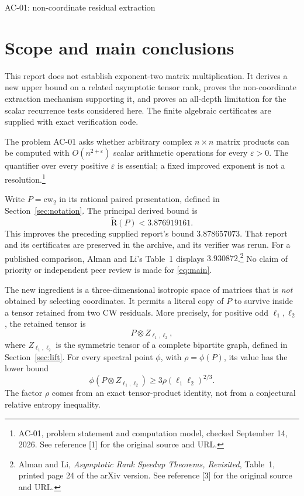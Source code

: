 \documentclass[11pt]{article}
\theoremstyle{definition}\newtheorem{definition}[theorem]{Definition}
\theoremstyle{remark}\newtheorem{remark}[theorem]{Remark}
\newcommand{\AR}{\widetilde{\mathrm R}}
\newcommand{\sref}[2]{\footnote{#1. See reference [#2] for the original source and URL.}}
\begin{document}
{\LARGE AC-01: non-coordinate residual extraction\par}\vspace{0.4em}

\section{Scope and main conclusions}

This report does not establish exponent-two matrix multiplication. It derives a new upper bound on a related asymptotic tensor rank, proves the non-coordinate extraction mechanism supporting it, and proves an all-depth limitation for the scalar recurrence tests considered here. The finite algebraic certificates are supplied with exact verification code.

The problem AC-01 asks whether arbitrary complex $n\times n$ matrix products can be computed with $O(n^{2+\varepsilon})$ scalar arithmetic operations for every $\varepsilon>0$. The quantifier over every positive $\varepsilon$ is essential; a fixed improved exponent is not a resolution.\sref{AC-01, problem statement and computation model, checked September 14, 2026}{1}

Write $P=\mathrm{cw}_2$ in its rational paired presentation, defined in Section~\ref{sec:notation}. The principal derived bound is
\begin{equation}\label{eq:main}
 \boxed{\AR(P)<3.876919161.}
\end{equation}
This improves the preceding supplied report's bound $3.878657073$. That report and its certificates are preserved in the archive, and its verifier was rerun. For a published comparison, Alman and Li's Table~1 displays $3.930872$.\sref{Alman and Li, \emph{Asymptotic Rank Speedup Theorems, Revisited}, Table~1, printed page 24 of the arXiv version}{3} No claim of priority or independent peer review is made for \eqref{eq:main}.

The new ingredient is a three-dimensional isotropic space of matrices that is \emph{not} obtained by selecting coordinates. It permits a literal copy of $P$ to survive inside a tensor retained from two CW residuals. More precisely, for positive odd $\ell_1,\ell_2$, the retained tensor is
\begin{equation}\label{eq:retained-intro}
 P\otimes Z_{\ell_1,\ell_2},
\end{equation}
where $Z_{\ell_1,\ell_2}$ is the symmetric tensor of a complete bipartite graph, defined in Section~\ref{sec:lift}. For every spectral point $\phi$, with $\rho=\phi(P)$, its value has the lower bound
\[
 \phi(P\otimes Z_{\ell_1,\ell_2})\geq 3\rho(\ell_1\ell_2)^{2/3}.
\]
The factor $\rho$ comes from an exact tensor-product identity, not from a conjectural relative entropy inequality.
\end{document}
